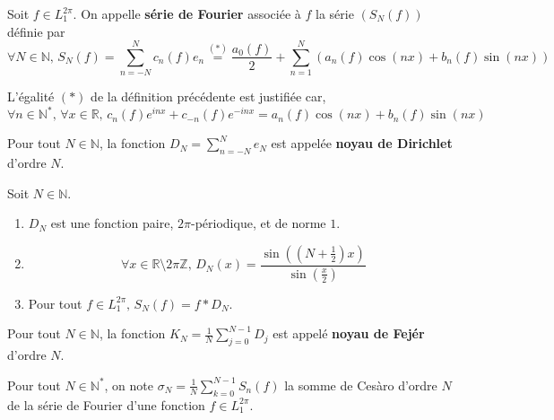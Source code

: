 
	\begin{definition}
		Soit $f \in L_1^{2\pi}$. On appelle \textbf{série de Fourier} associée à $f$ la série $(S_N(f))$ définie par
		\[ \forall N \in \mathbb{N}, \, S_N(f) = \sum_{n=-N}^{N} c_n(f) e_n \overset{(*)}{=} \frac{a_0(f)}{2} + \sum_{n = 1}^N (a_n(f) \cos(nx) + b_n(f) \sin(nx)) \]
	\end{definition}

	\begin{remark}
		L'égalité $(*)$ de la définition précédente est justifiée car,
		\[ \forall n \in \mathbb{N}^*, \, \forall x \in \mathbb{R}, \, c_n(f) e^{inx} + c_{-n}(f) e^{-inx} = a_n(f) \cos(nx) + b_n(f) \sin(nx) \]
	\end{remark}


	\begin{definition}
		Pour tout $N \in \mathbb{N}$, la fonction $D_N = \sum_{n=-N}^{N} e_N$ est appelée \textbf{noyau de Dirichlet} d'ordre $N$.
	\end{definition}

	\begin{proposition}
		Soit $N \in \mathbb{N}$.
		\begin{enumerate}[label=(\roman*)]
			\item $D_N$ est une fonction paire, $2\pi$-périodique, et de norme $1$.
			\item \[ \forall x \in \mathbb{R} \setminus 2 \pi \mathbb{Z}, \, D_N(x) = \frac{\sin \left(\left( N + \frac{1}{2} \right) x \right)}{\sin \left( \frac{x}{2} \right)} \]
			\item Pour tout $f \in L_1^{2 \pi}, \, S_N(f) = f * D_N$.
		\end{enumerate}
	\end{proposition}

	\begin{definition}
		Pour tout $N \in \mathbb{N}$, la fonction $K_N = \frac{1}{N} \sum_{j=0}^{N-1} D_j$ est appelé \textbf{noyau de Fejér} d'ordre $N$.
	\end{definition}

	\begin{notation}
		Pour tout $N \in \mathbb{N}^*$, on note $\sigma_N = \frac{1}{N} \sum_{k=0}^{N-1} S_n(f)$ la somme de Cesàro d'ordre $N$ de la série de Fourier d'une fonction $f \in L_1^{2 \pi}$.
	\end{notation}

